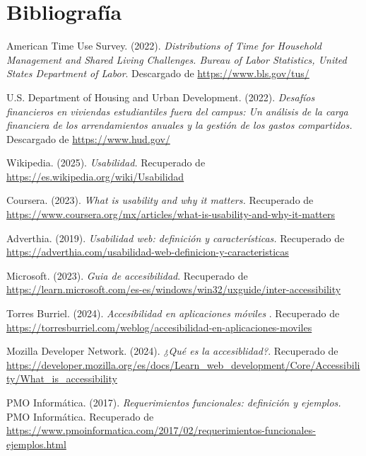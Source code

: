 \chapter{Bibliografía}
\label{cap:bibliografia}


American Time Use Survey. (2022). \textit{Distributions of Time for Household Management and Shared Living Challenges. 
Bureau of Labor Statistics, United States Department of Labor}. Descargado de \url{https://www.bls.gov/tus/}

U.S. Department of Housing and Urban Development. (2022). \textit{Desafíos financieros en viviendas estudiantiles fuera del campus: 
Un análisis de la carga financiera de los arrendamientos anuales y la gestión de los gastos compartidos.} Descargado de \url{https://www.hud.gov/}

Wikipedia. (2025). \textit{Usabilidad.} Recuperado de \url{https://es.wikipedia.org/wiki/Usabilidad}

Coursera. (2023). \textit{What is usability and why it matters.} 
Recuperado de \url{https://www.coursera.org/mx/articles/what-is-usability-and-why-it-matters}

Adverthia. (2019). \textit{Usabilidad web: definición y características.} Recuperado de \url{https://adverthia.com/usabilidad-web-definicion-y-caracteristicas}

Microsoft. (2023). \textit{Guia de accesibilidad}. Recuperado de \url{https://learn.microsoft.com/es-es/windows/win32/uxguide/inter-accessibility}

Torres Burriel. (2024). \textit{Accesibilidad en aplicaciones móviles }. Recuperado de \url{https://torresburriel.com/weblog/accesibilidad-en-aplicaciones-moviles}

Mozilla Developer Network. (2024). \textit{¿Qué es la accesiblidad?}. Recuperado de \url{https://developer.mozilla.org/es/docs/Learn_web_development/Core/Accessibility/What_is_accessibility}

PMO Informática. (2017). \textit{Requerimientos funcionales: definición y ejemplos.} PMO Informática. Recuperado de \url{https://www.pmoinformatica.com/2017/02/requerimientos-funcionales-ejemplos.html}


